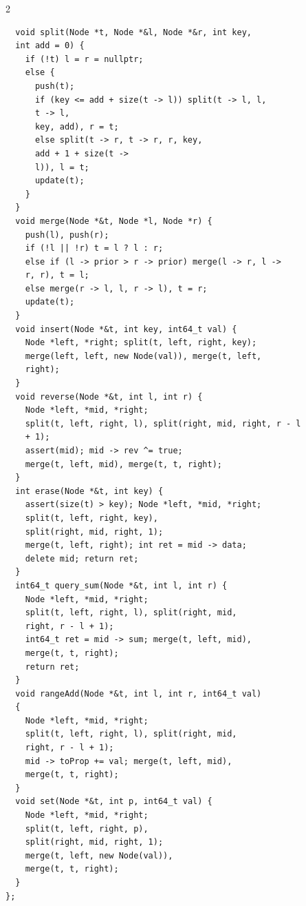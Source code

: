 \documentclass[10pt,a4paper]{article}
\begin{document}
\begin{paracol}{2}
\switchcolumn

\begin{lstlisting}
  void split(Node *t, Node *&l, Node *&r, int key,
  int add = 0) {
    if (!t) l = r = nullptr;
    else {
      push(t);
      if (key <= add + size(t -> l)) split(t -> l, l,
      t -> l,
      key, add), r = t;
      else split(t -> r, t -> r, r, key,
      add + 1 + size(t ->
      l)), l = t;
      update(t);
    }
  }
  void merge(Node *&t, Node *l, Node *r) {
    push(l), push(r);
    if (!l || !r) t = l ? l : r;
    else if (l -> prior > r -> prior) merge(l -> r, l ->
    r, r), t = l;
    else merge(r -> l, l, r -> l), t = r;
    update(t);
  }
  void insert(Node *&t, int key, int64_t val) {
    Node *left, *right; split(t, left, right, key);
    merge(left, left, new Node(val)), merge(t, left,
    right);
  }
  void reverse(Node *&t, int l, int r) {
    Node *left, *mid, *right;
    split(t, left, right, l), split(right, mid, right, r - l
    + 1);
    assert(mid); mid -> rev ^= true;
    merge(t, left, mid), merge(t, t, right);
  }
  int erase(Node *&t, int key) {
    assert(size(t) > key); Node *left, *mid, *right;
    split(t, left, right, key),
    split(right, mid, right, 1);
    merge(t, left, right); int ret = mid -> data;
    delete mid; return ret;
  }
  int64_t query_sum(Node *&t, int l, int r) {
    Node *left, *mid, *right;
    split(t, left, right, l), split(right, mid,
    right, r - l + 1);
    int64_t ret = mid -> sum; merge(t, left, mid),
    merge(t, t, right);
    return ret;
  }
  void rangeAdd(Node *&t, int l, int r, int64_t val)
  {
    Node *left, *mid, *right;
    split(t, left, right, l), split(right, mid,
    right, r - l + 1);
    mid -> toProp += val; merge(t, left, mid),
    merge(t, t, right);
  }
  void set(Node *&t, int p, int64_t val) {
    Node *left, *mid, *right;
    split(t, left, right, p),
    split(right, mid, right, 1);
    merge(t, left, new Node(val)),
    merge(t, t, right);
  }
};
\end{lstlisting}

\switchcolumn


\end{paracol}
\end{document}
